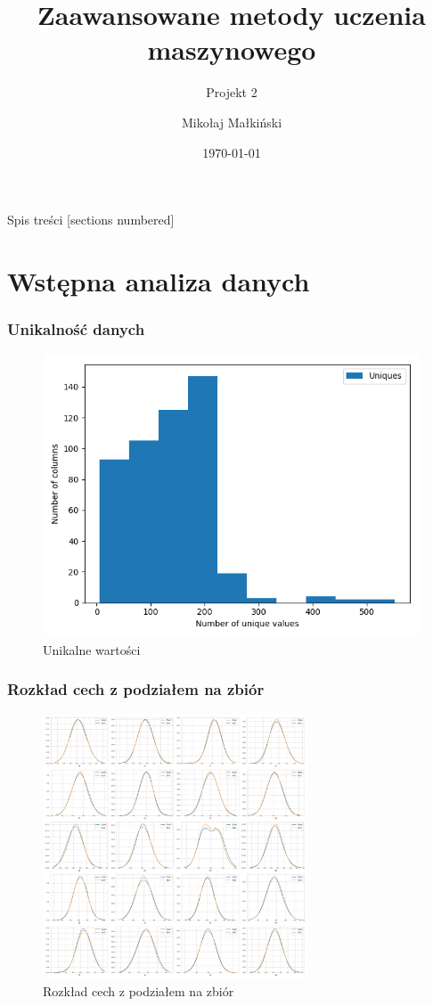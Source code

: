 \documentclass{beamer}
\title{
Zaawansowane metody uczenia maszynowego
}
\subtitle{
Projekt 2
}
\author{
Mikołaj Małkiński
}
\institute{
Politechnika Warszawska \\
Wydział Matematyki i Nauk Informacyjnych
}
\date{\today}
\begin{document}
    \maketitle

    \begin{frame}{Spis treści}
        [sections numbered]
        \tableofcontents[hideallsubsections]
    \end{frame}

    \section{Wstępna analiza danych}

    \begin{frame}
        \frametitle{Unikalność danych}
        \begin{figure}
            \centering
            \includegraphics[width=0.8\linewidth]{../images/uniqueness-train.png}
            \caption{Unikalne wartości}
            \label{fig:uniqueness-train}
        \end{figure}
    \end{frame}

    \begin{frame}
        \frametitle{Rozkład cech z podziałem na zbiór}
        \begin{figure}[!h]
            \centering
            \includegraphics[width=0.7\textwidth]{../images/feature-distribution-dataset.png}
            \caption{Rozkład cech z podziałem na zbiór}
        \end{figure}
    \end{frame}
\end{document}
